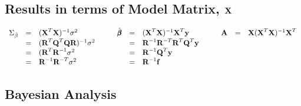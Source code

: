 \documentclass[11pt,a4paper]{article}
\begin{document}
\subsection{Results in terms of Model Matrix, $\textbf{X}$}

\[\begin{array}{rclcrclcrcl}
\Sigma_{\hat\beta}&=&(\textbf{X}^T\textbf{X})^{-1}\sigma^2&\quad&\hat{\pmb\beta}&=&(\textbf{X}^T\textbf{X})^{-1}\textbf{X}^T\textbf{y}&\quad&\textbf{A}&=&\textbf{X}(\textbf{X}^T\textbf{X})^{-1}\textbf{X}^T\\
&=&(\textbf{R}^T\textbf{Q}^T\textbf{QR})^{-1}\sigma^2&&&=&\textbf{R}^{-1}\textbf{R}^{-T}\textbf{R}^T\textbf{Q}^T\textbf{y}\\
&=&(\textbf{R}^T\textbf{R}^{-1}\sigma^2&&&=&\textbf{R}^{-1}\textbf{Q}^T\textbf{y}\\
&=&\textbf{R}^{-1}\textbf{R}^{-T}\sigma^2&&&=&\textbf{R}^{-1}\textbf{f}\\
\end{array}\]

\subsection{Bayesian Analysis}
\end{document}
